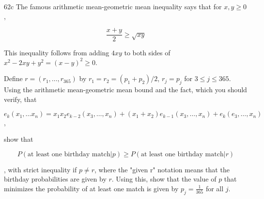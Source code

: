 \begin{exercise}{62c}
    The famous arithmetic mean-geometric mean inequality says that for $x,y \geq 0$,

    $$\frac{x+y}{2} \geq \sqrt{xy}$$

    This inequality follows from adding $4xy$ to both sides of $x^2-2xy+y^2=(x-y)^2\geq0$.

    Define $r = (r_1, \dots, r_{365})$ by $r_1 = r_2 = (p_1+p_2)/2$, $r_j = p_j$ for $3 \leq j \leq 365$. Using the arithmetic mean-geometric mean bound and the fact, which you should verify, that

    $$e_k(x_1, \dots x_n) = x_1x_2e_{k-2}(x_3, \dots, x_n) + (x_1+x_2)e_{k-1}(x_3, \dots, x_n) + e_k(e_3, \dots, x_n)$$, 

    show that

    $$P(\text{at least one birthday match} | p) \geq P(\text{at least one birthday match}|r)$$

    , with strict inequality if $p \neq r$, where the "given r" notation means that the birthday probabilities are given by $r$. Using this, show that the value of $p$ that minimizes the probability of at least one match is given by $p_j=\frac{1}{365}$ for all $j$.
\end{exercise}

